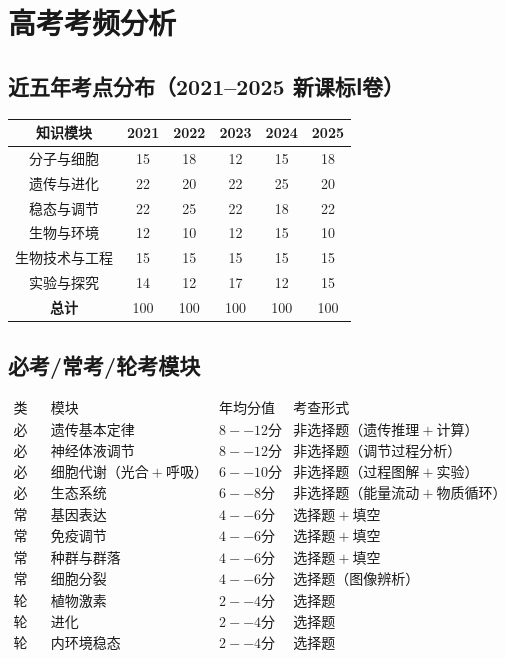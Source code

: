 \section{高考考频分析}

\subsection{近五年考点分布（2021--2025 新课标Ⅰ卷）}

\begin{center}
\begin{tabular}{c|c|c|c|c|c}
\textbf{知识模块} & \textbf{2021} & \textbf{2022} & \textbf{2023} & \textbf{2024} & \textbf{2025} \\ \hline
分子与细胞 & 15 & 18 & 12 & 15 & 18 \\
遗传与进化 & 22 & 20 & 22 & 25 & 20 \\
稳态与调节 & 22 & 25 & 22 & 18 & 22 \\
生物与环境 & 12 & 10 & 12 & 15 & 10 \\
生物技术与工程 & 15 & 15 & 15 & 15 & 15 \\
实验与探究 & 14 & 12 & 17 & 12 & 15 \\ \hline
\textbf{总计} & 100 & 100 & 100 & 100 & 100
\end{tabular}
\end{center}

\subsection{必考/常考/轮考模块}

\[
\begin{array}{c|c|c|c}
\text{类别} & \text{模块} & \text{年均分值} & \text{考查形式} \\ \hline
\textbf{必考} & 遗传基本定律 & 8--12 分 & 非选择题（遗传推理+计算） \\
\textbf{必考} & 神经体液调节 & 8--12 分 & 非选择题（调节过程分析） \\
\textbf{必考} & 细胞代谢（光合+呼吸） & 6--10 分 & 非选择题（过程图解+实验） \\
\textbf{必考} & 生态系统 & 6--8 分 & 非选择题（能量流动+物质循环） \\
\textbf{常考} & 基因表达 & 4--6 分 & 选择题+填空 \\
\textbf{常考} & 免疫调节 & 4--6 分 & 选择题+填空 \\
\textbf{常考} & 种群与群落 & 4--6 分 & 选择题+填空 \\
\textbf{常考} & 细胞分裂 & 4--6 分 & 选择题（图像辨析） \\
\textbf{轮考} & 植物激素 & 2--4 分 & 选择题 \\
\textbf{轮考} & 进化 & 2--4 分 & 选择题 \\
\textbf{轮考} & 内环境稳态 & 2--4 分 & 选择题
\end{array}
\]

